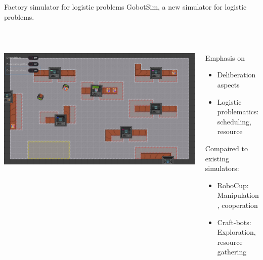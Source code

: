\begin{frame}{Factory simulator for logistic problems}
    GobotSim, a new simulator for logistic problems.

    ~


    \begin{columns}
        \begin{column}{0.5\textwidth}
            \includegraphics[width=\linewidth]{images/gobot-rae.png}
        \end{column}
        \begin{column}{0.5\textwidth}
            Emphasis on
            \begin{itemize}
                \item Deliberation aspects
                \item Logistic problematics: scheduling, resource
            \end{itemize}
            
            Compaired to existing simulators:
            \begin{itemize}
                \item RoboCup: Manipulation, cooperation
                \item Craft-bots: Exploration, resource gathering
            \end{itemize}
        \end{column}
    \end{columns}
\end{frame}

